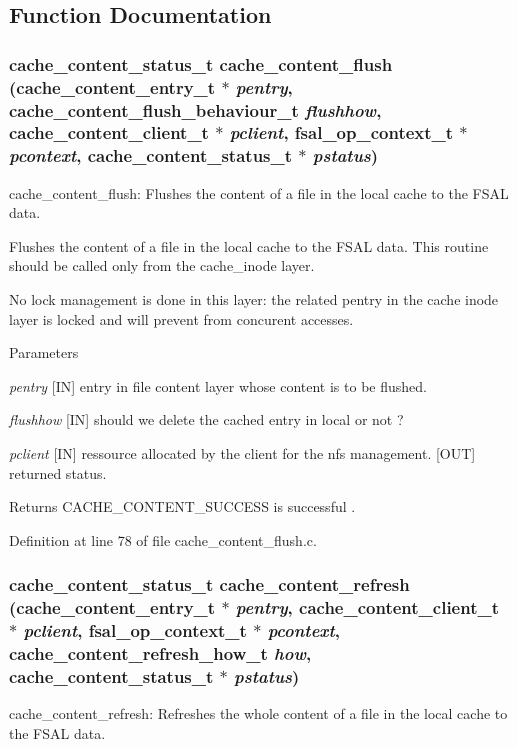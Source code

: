 \subsection{Function Documentation}
\subsubsection[{cache\_\-content\_\-flush}]{\setlength{\rightskip}{0pt plus 5cm}cache\_\-content\_\-status\_\-t cache\_\-content\_\-flush (cache\_\-content\_\-entry\_\-t $\ast$ {\em pentry}, \/  cache\_\-content\_\-flush\_\-behaviour\_\-t {\em flushhow}, \/  cache\_\-content\_\-client\_\-t $\ast$ {\em pclient}, \/  fsal\_\-op\_\-context\_\-t $\ast$ {\em pcontext}, \/  cache\_\-content\_\-status\_\-t $\ast$ {\em pstatus})}\label{cache__content__flush_8c_ac66f7369f13dd6fec79abfccabde8a18}
cache\_\-content\_\-flush: Flushes the content of a file in the local cache to the FSAL data.

Flushes the content of a file in the local cache to the FSAL data. This routine should be called only from the cache\_\-inode layer.

No lock management is done in this layer: the related pentry in the cache inode layer is locked and will prevent from concurent accesses.


\begin{DoxyParams}{Parameters}
\item[{\em pentry}][IN] entry in file content layer whose content is to be flushed. \item[{\em flushhow}][IN] should we delete the cached entry in local or not ? \item[{\em pclient}][IN] ressource allocated by the client for the nfs management.  [OUT] returned status.\end{DoxyParams}
\begin{DoxyReturn}{Returns}
CACHE\_\-CONTENT\_\-SUCCESS is successful . 
\end{DoxyReturn}


Definition at line 78 of file cache\_\-content\_\-flush.c.
\subsubsection[{cache\_\-content\_\-refresh}]{\setlength{\rightskip}{0pt plus 5cm}cache\_\-content\_\-status\_\-t cache\_\-content\_\-refresh (cache\_\-content\_\-entry\_\-t $\ast$ {\em pentry}, \/  cache\_\-content\_\-client\_\-t $\ast$ {\em pclient}, \/  fsal\_\-op\_\-context\_\-t $\ast$ {\em pcontext}, \/  cache\_\-content\_\-refresh\_\-how\_\-t {\em how}, \/  cache\_\-content\_\-status\_\-t $\ast$ {\em pstatus})}\label{cache__content__flush_8c_a8caa78929e28b45a53868eb38c0d54a2}
cache\_\-content\_\-refresh: Refreshes the whole content of a file in the local cache to the FSAL data.

